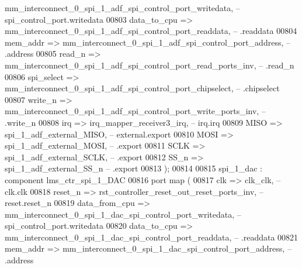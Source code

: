 \begin{DoxyCode}
      mm_interconnect_0_spi_1_adf_spi_control_port_writedata,\textcolor{keyword}{       -- spi\_control\_port.writedata}
00803             data\_to\_cpu   => 
      mm_interconnect_0_spi_1_adf_spi_control_port_readdata,\textcolor{keyword}{        --                 .readdata}
00804             mem\_addr      => 
      mm_interconnect_0_spi_1_adf_spi_control_port_address,\textcolor{keyword}{         --                 .address}
00805             read\_n        => 
      mm_interconnect_0_spi_1_adf_spi_control_port_read_ports_inv,\textcolor{keyword}{  --                 .read\_n}
00806             spi\_select    => 
      mm_interconnect_0_spi_1_adf_spi_control_port_chipselect,\textcolor{keyword}{      --                 .chipselect}
00807             write\_n       => 
      mm_interconnect_0_spi_1_adf_spi_control_port_write_ports_inv,\textcolor{keyword}{ --                 .write\_n}
00808             irq           => irq_mapper_receiver3_irq,\textcolor{keyword}{                                     --             
       irq.irq}
00809             MISO          => spi_1_adf_external_MISO,\textcolor{keyword}{                                      --        
       external.export}
00810             MOSI          => spi_1_adf_external_MOSI,\textcolor{keyword}{                                      --              
         .export}
00811             SCLK          => spi_1_adf_external_SCLK,\textcolor{keyword}{                                      --              
         .export}
00812             SS\_n          => spi_1_adf_external_SS_n                                       \textcolor{keyword}{--              
         .export}
00813         \textcolor{vhdlchar}{)};
00814 
00815     spi_1_dac : \textcolor{keywordflow}{component} lms\_ctr\_spi\_1\_DAC
00816         \textcolor{keywordflow}{port} \textcolor{keywordflow}{map} (
00817             clk           => clk_clk,\textcolor{keyword}{                                                      --             
       clk.clk}
00818             reset\_n       => rst_controller_reset_out_reset_ports_inv,\textcolor{keyword}{                     --           
       reset.reset\_n}
00819             data\_from\_cpu => 
      mm_interconnect_0_spi_1_dac_spi_control_port_writedata,\textcolor{keyword}{       -- spi\_control\_port.writedata}
00820             data\_to\_cpu   => 
      mm_interconnect_0_spi_1_dac_spi_control_port_readdata,\textcolor{keyword}{        --                 .readdata}
00821             mem\_addr      => 
      mm_interconnect_0_spi_1_dac_spi_control_port_address,\textcolor{keyword}{         --                 .address}

\end{DoxyCode}
